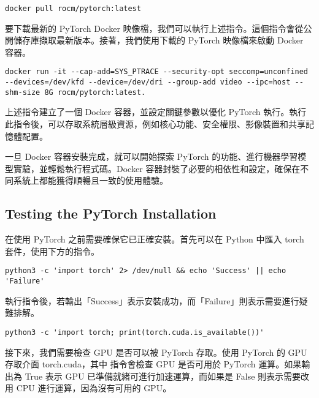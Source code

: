 \begin{lstlisting}[numbers=none, caption={獲取最新PyTorch docker映像檔的指令}, captionpos=t, label={lst:cmd_pytorch_docker_image}]
docker pull rocm/pytorch:latest
\end{lstlisting}

要下載最新的 PyTorch Docker 映像檔，我們可以執行上述指令。這個指令會從公開儲存庫擷取最新版本。接著，我們使用下載的 PyTorch 映像檔來啟動 Docker 容器。

\begin{lstlisting}[numbers=none, caption={安裝PyTorch的指令}, captionpos=t, label={lst:cmd_pytorch_install}]
docker run -it --cap-add=SYS_PTRACE --security-opt seccomp=unconfined --devices=/dev/kfd --device=/dev/dri --group-add video --ipc=host --shm-size 8G rocm/pytorch:latest.
\end{lstlisting}

上述指令建立了一個 Docker 容器，並設定關鍵參數以優化 PyTorch 執行。執行此指令後，可以存取系統層級資源，例如核心功能、安全權限、影像裝置和共享記憶體配置。

一旦 Docker 容器安裝完成，就可以開始探索 PyTorch 的功能、進行機器學習模型實驗，並輕鬆執行程式碼。Docker 容器封裝了必要的相依性和設定，確保在不同系統上都能獲得順暢且一致的使用體驗。

\subsection{Testing the PyTorch Installation}

在使用 PyTorch 之前需要確保它已正確安裝。首先可以在 Python 中匯入 torch 套件，使用下方的指令。

\begin{lstlisting}[numbers=none, caption={測試PyTorch安裝結果的指令}, captionpos=t, label={lst:cmd_pytorch_install_test}]
python3 -c 'import torch' 2> /dev/null && echo 'Success' || echo 'Failure'
\end{lstlisting}

執行指令後，若輸出「Success」表示安裝成功，而「Failure」則表示需要進行疑難排解。

\begin{lstlisting}[numbers=none, caption={確認GPU是否可用的指令}, captionpos=t, label={lst:cmd_pytorch_canusegpu}]
python3 -c 'import torch; print(torch.cuda.is_available())'
\end{lstlisting}

接下來，我們需要檢查 GPU 是否可以被 PyTorch 存取。使用 PyTorch 的 GPU 存取介面 torch.cuda，其中  指令會檢查 GPU 是否可用於 PyTorch 運算。如果輸出為 True 表示 GPU 已準備就緒可進行加速運算，而如果是 False 則表示需要改用 CPU 進行運算，因為沒有可用的 GPU。

